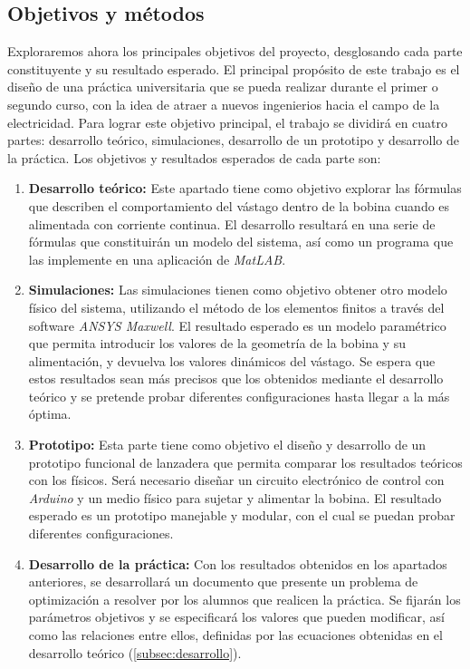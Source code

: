 \subsection{Objetivos y métodos}
\label{sec:motivacionyobjetivos}

Exploraremos ahora los principales objetivos del proyecto, desglosando cada parte constituyente y su resultado esperado. El principal propósito de este trabajo es el diseño de una práctica universitaria que se pueda realizar durante el primer o segundo curso, con la idea de atraer a nuevos ingenierios hacia el campo de la electricidad. Para lograr este objetivo principal, el trabajo se dividirá en cuatro partes: desarrollo teórico, simulaciones, desarrollo de un prototipo y desarrollo de la práctica. Los objetivos y resultados esperados de cada parte son:

\begin{enumerate}
    \item \textbf{Desarrollo teórico:} Este apartado tiene como objetivo explorar las fórmulas que describen el comportamiento del vástago dentro de la bobina cuando es alimentada con corriente continua. El desarrollo resultará en una serie de fórmulas que constituirán un modelo del sistema, así como un programa que las implemente en una aplicación de \textit{MatLAB\textregistered}.
    \item \textbf{Simulaciones:} Las simulaciones tienen como objetivo obtener otro modelo físico del sistema, utilizando el método de los elementos finitos a través del software \textit{ANSYS Maxwell\textregistered}. El resultado esperado es un modelo paramétrico que permita introducir los valores de la geometría de la bobina y su alimentación, y devuelva los valores dinámicos del vástago. Se espera que estos resultados sean más precisos que los obtenidos mediante el desarrollo teórico y se pretende probar diferentes configuraciones hasta llegar a la más óptima.
    \item \textbf{Prototipo:} Esta parte tiene como objetivo el diseño y desarrollo de un prototipo funcional de lanzadera que permita comparar los resultados teóricos con los físicos. Será necesario diseñar un circuito electrónico de control con \textit{Arduino\textregistered} y un medio físico para sujetar y alimentar la bobina. El resultado esperado es un prototipo manejable y modular, con el cual se puedan probar diferentes configuraciones.
    \item \textbf{Desarrollo de la práctica:} Con los resultados obtenidos en los apartados anteriores, se desarrollará un documento que presente un problema de optimización a resolver por los alumnos que realicen la práctica. Se fijarán los parámetros objetivos y se especificará los valores que pueden modificar, así como las relaciones entre ellos, definidas por las ecuaciones obtenidas en el desarrollo teórico (\ref{subsec:desarrollo}).
\end{enumerate}

